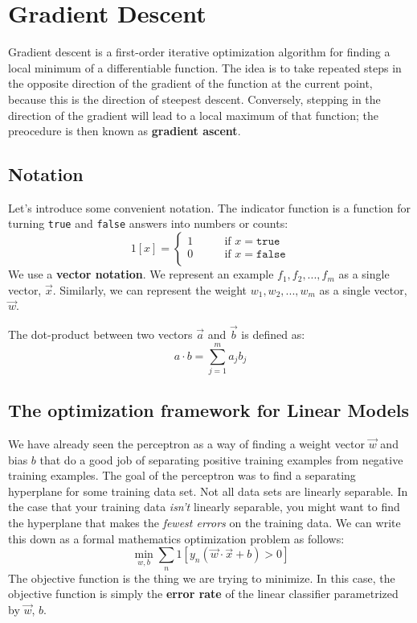 \chapter{Gradient Descent}

Gradient descent is a first-order iterative optimization algorithm for finding a local minimum of a differentiable function. The idea is to take repeated steps in the opposite direction of the gradient of the function at the current point, because this is the direction of steepest descent. Conversely, stepping in the direction of the gradient will lead to a local maximum of that function; the preocedure is then known as \textbf{gradient ascent}.

\section{Notation}
Let's introduce some convenient notation. The indicator function is a function for turning \texttt{true} and \texttt{false} answers into numbers or counts:
\begin{equation}
    1[x] = \begin{cases}
        1\qquad &\text{if }x=\texttt{true}\\
        0\qquad &\text{if }x=\texttt{false}\\
    \end{cases}
\end{equation}
We use a \textbf{vector notation}. We represent an example \(f_1,f_2,...,f_m\) as a single vector, \(\vec{x}\). Similarly, we can represent the weight \(w_1,w_2,...,w_m\) as a single vector, \(\vec{w}\).

The dot-product between two vectors \(\vec{a}\) and \(\vec{b}\) is defined as:
\begin{equation}
    a \cdot b = \sum_{j=1}^m a_jb_j
\end{equation}

\section{The optimization framework for Linear Models}
We have already seen the perceptron as a way of finding a weight vector \(\vec{w}\) and bias \(b\) that do a good job of separating positive training examples from negative training examples. The goal of the perceptron was to find a separating hyperplane for some training data set. Not all data sets are linearly separable. In the case that your training data \emph{isn't} linearly separable, you might want to find the hyperplane that makes the \emph{fewest errors} on the training data. We can write this down as a formal mathematics optimization problem as follows:
\begin{equation}
    \label{eqn:optimization}
    \min_{w,b} \sum_n 1[y_n(\vec{w} \cdot \vec{x} + b) > 0]
\end{equation}
The objective function is the thing we are trying to minimize. In this case, the objective function is simply the \textbf{error rate} of the linear classifier parametrized by \(\vec{w}\), \(b\).

